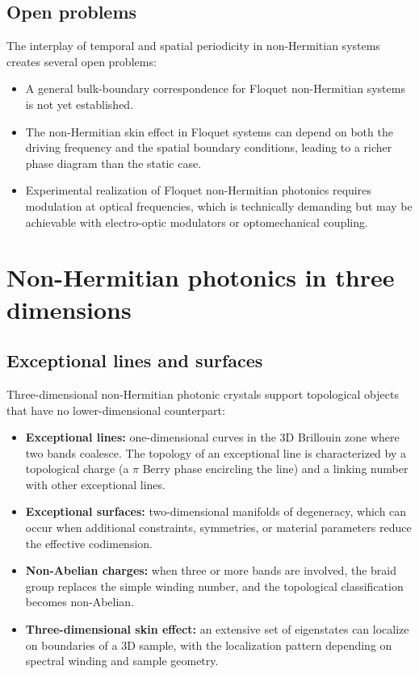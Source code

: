 \subsection{Open problems}
\label{ssec:floquet-open}

The interplay of temporal and spatial periodicity in non-Hermitian
systems creates several open problems:
\begin{itemize}
 \item A general bulk-boundary correspondence for Floquet
 non-Hermitian systems is not yet established.
 \item The non-Hermitian skin effect in Floquet systems can depend on
 both the driving frequency and the spatial boundary conditions,
 leading to a richer phase diagram than the static case.
 \item Experimental realization of Floquet non-Hermitian photonics
 requires modulation at optical frequencies, which is technically
 demanding but may be achievable with electro-optic modulators or
 optomechanical coupling.
\end{itemize}


\section{Non-Hermitian photonics in three dimensions}
\label{sec:3d-nh}

\subsection{Exceptional lines and surfaces}
\label{ssec:3d-topology}

Three-dimensional non-Hermitian photonic crystals support topological
objects that have no lower-dimensional counterpart:
\begin{itemize}
 \item \textbf{Exceptional lines:} one-dimensional curves in the 3D
 Brillouin zone where two bands coalesce. The topology of an
 exceptional line is characterized by a topological charge
 (a $\pi$ Berry phase encircling the line) and a linking number with
 other exceptional lines.
 \item \textbf{Exceptional surfaces:} two-dimensional manifolds of
 degeneracy, which can occur when additional constraints, symmetries,
 or material parameters reduce the effective codimension.
 \item \textbf{Non-Abelian charges:} when three or more bands are
 involved, the braid group replaces the simple winding number, and
 the topological classification becomes non-Abelian.
 \item \textbf{Three-dimensional skin effect:} an extensive set of
 eigenstates can localize on boundaries of a 3D sample, with the
 localization pattern depending on spectral winding and sample geometry.
\end{itemize}

